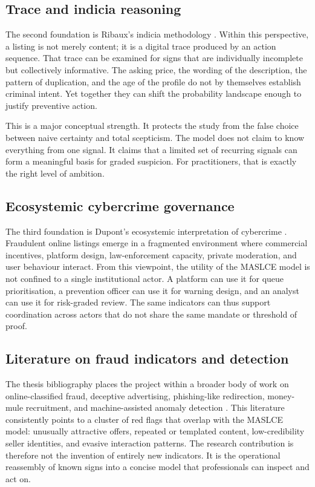 \documentclass[11pt,a4paper]{article}
\begin{document}
\subsection{Trace and indicia reasoning}
The second foundation is Ribaux's indicia methodology \cite{ribaux2023}. Within this perspective, a listing is not merely content; it is a digital trace produced by an action sequence. That trace can be examined for signs that are individually incomplete but collectively informative. The asking price, the wording of the description, the pattern of duplication, and the age of the profile do not by themselves establish criminal intent. Yet together they can shift the probability landscape enough to justify preventive action.

This is a major conceptual strength. It protects the study from the false choice between naive certainty and total scepticism. The model does not claim to know everything from one signal. It claims that a limited set of recurring signals can form a meaningful basis for graded suspicion. For practitioners, that is exactly the right level of ambition.

\subsection{Ecosystemic cybercrime governance}
The third foundation is Dupont's ecosystemic interpretation of cybercrime \cite{dupont2014,dupont2024}. Fraudulent online listings emerge in a fragmented environment where commercial incentives, platform design, law-enforcement capacity, private moderation, and user behaviour interact. From this viewpoint, the utility of the MASLCE model is not confined to a single institutional actor. A platform can use it for queue prioritisation, a prevention officer can use it for warning design, and an analyst can use it for risk-graded review. The same indicators can thus support coordination across actors that do not share the same mandate or threshold of proof.

\subsection{Literature on fraud indicators and detection}
The thesis bibliography places the project within a broader body of work on online-classified fraud, deceptive advertising, phishing-like redirection, money-mule recruitment, and machine-assisted anomaly detection \cite{alrousan2020,alzghoul2024,mccormick2013,shaukat2023,saumya2022,nanath2023,leukfeldt2017,mokhberi2024}. This literature consistently points to a cluster of red flags that overlap with the MASLCE model: unusually attractive offers, repeated or templated content, low-credibility seller identities, and evasive interaction patterns. The research contribution is therefore not the invention of entirely new indicators. It is the operational reassembly of known signs into a concise model that professionals can inspect and act on.
\end{document}
